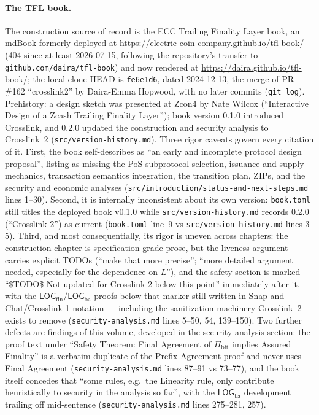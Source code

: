 \documentclass[11pt,a4paper]{article}
\theoremstyle{definition}
\begin{document}
\paragraph{The TFL book.} The construction source of record is the ECC
Trailing Finality Layer book, an mdBook formerly deployed at
\url{https://electric-coin-company.github.io/tfl-book/} (404 since at
least 2026-07-15, following the repository's transfer to
\texttt{github.com/daira/tfl-book}) and now rendered at
\url{https://daira.github.io/tfl-book/}; the local clone
HEAD is \texttt{fe6e1d6}, dated 2024-12-13, the merge of PR \#162
``crosslink2'' by Daira-Emma Hopwood, with no later commits
(\texttt{git log}). Prehistory: a design sketch
was presented at Zcon4 by Nate Wilcox (``Interactive Design of a Zcash
Trailing Finality Layer''); book version 0.1.0 introduced Crosslink, and
0.2.0 updated the construction and security analysis to Crosslink~2
(\texttt{src/version-history.md}). Three rigor caveats govern every
citation of it. First, the book self-describes as ``an early and
incomplete protocol design proposal'', listing as missing the PoS
subprotocol selection, issuance and supply mechanics, transaction
semantics integration, the transition plan, ZIPs, and the security and
economic analyses (\texttt{src/introduction/status-and-next-steps.md}
lines 1--30). Second, it is internally inconsistent about its own
version: \texttt{book.toml} still titles the deployed book v0.1.0 while
\texttt{src/version-history.md} records 0.2.0 (``Crosslink 2'') as
current (\texttt{book.toml} line~9 vs
\texttt{src/version-history.md} lines 3--5). Third, and most
consequentially, its rigor is uneven across chapters: the construction
chapter is specification-grade prose, but the liveness argument carries
explicit TODOs (``make that more precise''; ``more detailed argument
needed, especially for the dependence on $L$''), and the safety section
is marked ``\$TODO\$ Not updated for Crosslink 2 below this point''
immediately after it, with the
$\mathsf{LOG}_{\mathrm{fin}}$/$\mathsf{LOG}_{\mathrm{ba}}$ proofs below
that marker still written in Snap-and-Chat/Crosslink-1 notation ---
including the sanitization machinery Crosslink~2 exists to remove
(\texttt{security-analysis.md} lines 5--50, 54, 139--150). Two further
defects are findings of this volume, developed in the security-analysis
section: the proof text under ``Safety Theorem: Final Agreement of
$\Pi_{\mathrm{bft}}$ implies Assured Finality'' is a verbatim duplicate
of the Prefix Agreement proof and never uses Final Agreement
(\texttt{security-analysis.md} lines 87--91 vs 73--77), and the book
itself concedes that ``some rules, e.g.\ the Linearity rule, only
contribute heuristically to security in the analysis so far'', with the
$\mathsf{LOG}_{\mathrm{ba}}$ development trailing off mid-sentence
(\texttt{security-analysis.md} lines 275--281, 257).
\end{document}
